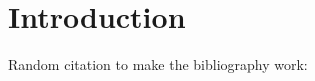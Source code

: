 \chapter{Introduction}\label{cha:problem}
Random citation to make the bibliography work: \cite{koller2009probabilistic}
